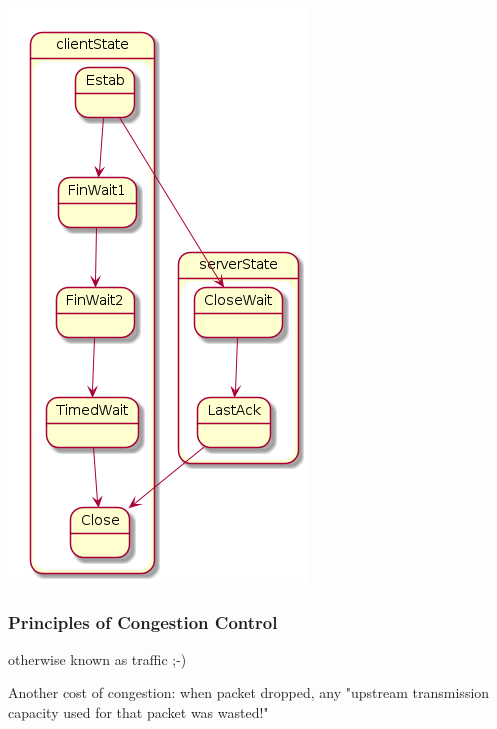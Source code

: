 \documentclass[11pt]{article}
\begin{document}
\begin{center}
\includegraphics[width=.9\linewidth]{TCPclosing.png}
\end{center}

\subsubsection{Principles of Congestion Control}
\label{sec:orga5f74be}
otherwise known as traffic ;-)

Another cost of congestion: when packet dropped, any "upstream
transmission capacity used for that packet was wasted!"
\end{document}
